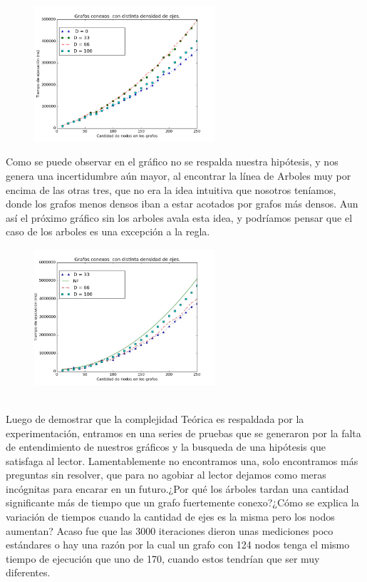 \documentclass[spanish,12pt]{article}
\begin{document}
\begin{figure}[H]
\centering
\includegraphics[width=0.6\textwidth]{VariasDensidades}
\caption{}
\end{figure}

Como se puede observar en el gráfico no se respalda nuestra hipótesis, y nos genera una incertidumbre aún mayor, al encontrar la línea de Arboles muy por encima de las otras tres, que no era la idea intuitiva que nosotros teníamos, donde los grafos menos densos iban a estar acotados por grafos más densos. Aun así el próximo gráfico sin los arboles avala esta idea, y podríamos pensar que el caso de los arboles es una excepción a la regla.

\begin{figure}[H]
\centering
\includegraphics     [width=0.6\textwidth]{VariasDensidadesSinArbol}
\caption{}
\end{figure}

\\
Luego de demostrar que la complejidad Teórica es respaldada por la experimentación, entramos en una series de pruebas que se generaron por la falta de entendimiento de nuestros gráficos y la busqueda de una hipótesis que satisfaga al lector. Lamentablemente no encontramos una, solo encontramos más preguntas sin resolver, que para no agobiar al lector dejamos como meras incógnitas para encarar en un futuro.¿Por qué los árboles tardan una cantidad significante más de tiempo que un grafo fuertemente conexo?¿Cómo se explica la variación de tiempos cuando la cantidad de ejes es la misma pero los nodos aumentan? Acaso fue que las 3000 iteraciones dieron unas mediciones poco estándares o hay una razón por la cual un grafo con 124 nodos tenga el mismo tiempo de ejecución que uno de 170, cuando estos tendrían que ser muy diferentes.


\\

\\
\\
\end{document}
